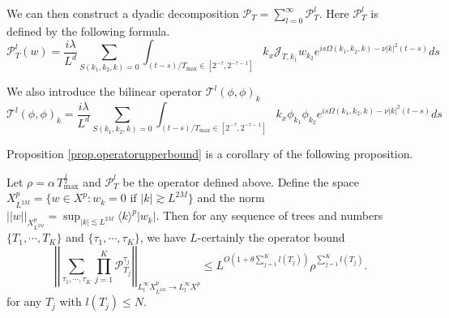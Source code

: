 We can then construct a dyadic decomposition  $\mathcal{P}_{T}=\sum_{l=0}^{\infty} \mathcal{P}^l_{T}$. Here $\mathcal{P}_T^l$ is defined by the following formula. 
\begin{equation}
\mathcal{P}_T^l(w)=\frac{i\lambda}{L^{d}} \sum\limits_{S(k_1,k_2,k)=0}\int_{(t-s)/T_{\text{max}}\in [2^{-\tau},2^{-\tau-1}]}k_{x}\mathcal{J}_{T,k_1} w_{k_2}e^{i s\Omega(k_1,k_2,k)- \nu|k|^2(t-s)} ds
\end{equation}

We also introduce the bilinear operator $\mathcal{T}^l(\phi,\phi)_k$
\begin{equation}
\mathcal{T}^l(\phi,\phi)_k=\frac{i\lambda}{L^{d}} \sum\limits_{S(k_1,k_2,k)=0}\int_{(t-s)/T_{\text{max}}\in [2^{-\tau},2^{-\tau-1}]}k_{x}\phi_{k_1} \phi_{k_2}e^{i s\Omega(k_1,k_2,k)- \nu|k|^2(t-s)} ds
\end{equation}


Proposition \ref{prop.operatorupperbound} is a corollary of the following proposition.

\begin{prop}\label{prop.operatorupperbound'}
Let $\rho=\alpha\, T^{\frac{1}{2}}_{\text{max}}$ and $\mathcal{P}^l_{T}$ be the operator defined above. Define the space $X^{p}_{L^{2M}}=\{w\in X^p: w_k=0\text{ if }|k|\gtrsim L^{2M}\}$ and the norm $||w||_{X^{p}_{L^{2M}}}=\sup_{|k|\lesssim L^{2M}} \langle k\rangle^{p} |w_k|$. Then for any sequence of trees and numbers $\{T_1,\cdots,T_K\}$ and $\{\tau_1,\cdots,\tau_K\}$, we have $L$-certainly the operator bound
\begin{equation}\label{eq.operatornormtau}
    \left|\left|\sum_{\tau_1,\cdots,\tau_K}\prod_{j=1}^K\mathcal{P}^{\tau_j}_{T_j}\right|\right|_{L_t^{\infty}X^{p}_{L^{2M}}\rightarrow L_t^{\infty}X^{p}}\le L^{O\left(1+\theta \sum_{j=1}^K l(T_j)\right)} \rho^{\sum_{j=1}^K l(T_j)}.
\end{equation}
for any $T_j$ with $l(T_j)\le N$. 
\end{prop}

